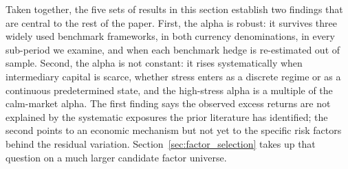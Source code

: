 Taken together, the five sets of results in this section establish two
findings that are central to the rest of the paper. First, the alpha
is robust: it survives three widely used benchmark frameworks, in both
currency denominations, in every sub-period we examine, and when each
benchmark hedge is re-estimated out of sample. Second, the alpha is
not constant: it rises systematically when intermediary capital is
scarce, whether stress enters as a discrete regime or as a continuous
predetermined state, and the high-stress alpha is a multiple of the
calm-market alpha. The first finding says the observed excess returns
are not explained by the systematic exposures the prior literature has
identified; the second points to an economic mechanism but not yet to
the specific risk factors behind the residual variation.
Section~\ref{sec:factor_selection} takes up that question on a much
larger candidate factor universe.